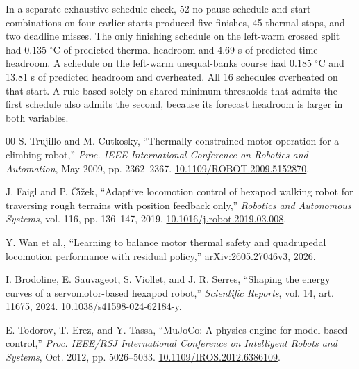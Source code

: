 \documentclass{ieeeaccess}
\begin{document}
In a separate exhaustive schedule check, 52 no-pause schedule-and-start combinations on four earlier starts produced five finishes, 45 thermal stops, and two deadline misses. The only finishing schedule on the left-warm crossed split had 0.135 \ensuremath{{}^{\circ}\mathrm{C}} of predicted thermal headroom and 4.69 s of predicted time headroom. A schedule on the left-warm unequal-banks course had 0.185 \ensuremath{{}^{\circ}\mathrm{C}} and 13.81 s of predicted headroom and overheated. All 16 schedules overheated on that start. A rule based solely on shared minimum thresholds that admits the first schedule also admits the second, because its forecast headroom is larger in both variables.

\clearpage
\begin{thebibliography}{00}
S. Trujillo and M. Cutkosky, \textquotedblleft{}Thermally constrained motor operation for a climbing robot,\textquotedblright{} \emph{Proc. IEEE International Conference on Robotics and Automation}, May 2009, pp. 2362--2367. \href{https://doi.org/10.1109/ROBOT.2009.5152870}{10.1109/ROBOT.2009.5152870}.

J. Faigl and P. \v{C}\'{\i}\v{z}ek, \textquotedblleft{}Adaptive locomotion control of hexapod walking robot for traversing rough terrains with position feedback only,\textquotedblright{} \emph{Robotics and Autonomous Systems}, vol. 116, pp. 136--147, 2019. \href{https://doi.org/10.1016/j.robot.2019.03.008}{10.1016/j.robot.2019.03.008}.

Y. Wan et al., \textquotedblleft{}Learning to balance motor thermal safety and quadrupedal locomotion performance with residual policy,\textquotedblright{} \href{https://arxiv.org/abs/2605.27046v3}{arXiv:2605.27046v3}, 2026.

I. Brodoline, E. Sauvageot, S. Viollet, and J. R. Serres, \textquotedblleft{}Shaping the energy curves of a servomotor-based hexapod robot,\textquotedblright{} \emph{Scientific Reports}, vol. 14, art. 11675, 2024. \href{https://doi.org/10.1038/s41598-024-62184-y}{10.1038/s41598-024-62184-y}.

E. Todorov, T. Erez, and Y. Tassa, \textquotedblleft{}MuJoCo: A physics engine for model-based control,\textquotedblright{} \emph{Proc. IEEE/RSJ International Conference on Intelligent Robots and Systems}, Oct. 2012, pp. 5026--5033. \href{https://doi.org/10.1109/IROS.2012.6386109}{10.1109/IROS.2012.6386109}.

\end{thebibliography}

\EOD
\end{document}
